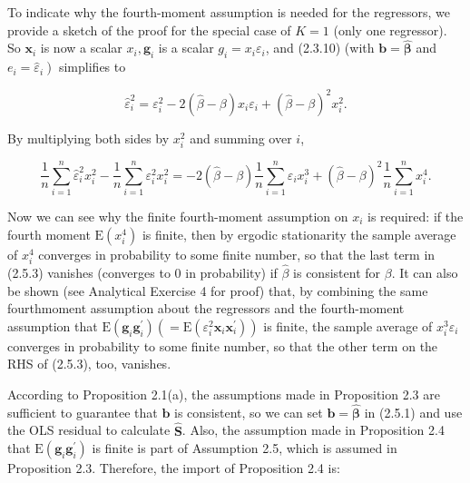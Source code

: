 \documentclass[10pt]{article}
\begin{document}
To indicate why the fourth-moment assumption is needed for the regressors, we provide a sketch of the proof for the special case of $K=1$ (only one regressor). So $\mathbf{x}_{i}$ is now a scalar $x_{i}, \mathbf{g}_{i}$ is a scalar $g_{i}=x_{i} \varepsilon_{i}$, and (2.3.10) (with $\mathbf{b}=\widehat{\boldsymbol{\beta}}$ and $\left.e_{i}=\hat{\varepsilon}_{i}\right)$ simplifies to


\begin{equation*}
\hat{\varepsilon}_{i}^{2}=\varepsilon_{i}^{2}-2(\widehat{\beta}-\beta) x_{i} \varepsilon_{i}+(\widehat{\beta}-\beta)^{2} x_{i}^{2} . \tag{2.5.2}
\end{equation*}


By multiplying both sides by $x_{i}^{2}$ and summing over $i$,


\begin{equation*}
\frac{1}{n} \sum_{i=1}^{n} \hat{\varepsilon}_{i}^{2} x_{i}^{2}-\frac{1}{n} \sum_{i=1}^{n} \varepsilon_{i}^{2} x_{i}^{2}=-2(\widehat{\beta}-\beta) \frac{1}{n} \sum_{i=1}^{n} \varepsilon_{i} x_{i}^{3}+(\widehat{\beta}-\beta)^{2} \frac{1}{n} \sum_{i=1}^{n} x_{i}^{4} . \tag{2.5.3}
\end{equation*}


Now we can see why the finite fourth-moment assumption on $x_{i}$ is required: if the fourth moment $\mathrm{E}\left(x_{i}^{4}\right)$ is finite, then by ergodic stationarity the sample average of $x_{i}^{4}$ converges in probability to some finite number, so that the last term in (2.5.3) vanishes (converges to 0 in probability) if $\widehat{\beta}$ is consistent for $\beta$. It can also be shown (see Analytical Exercise 4 for proof) that, by combining the same fourthmoment assumption about the regressors and the fourth-moment assumption that $\mathrm{E}\left(\mathbf{g}_{i} \mathbf{g}_{i}^{\prime}\right)\left(=\mathrm{E}\left(\varepsilon_{i}^{2} \mathbf{x}_{i} \mathbf{x}_{i}^{\prime}\right)\right)$ is finite, the sample average of $x_{i}^{3} \varepsilon_{i}$ converges in probability to some finite number, so that the other term on the RHS of (2.5.3), too, vanishes.

According to Proposition 2.1(a), the assumptions made in Proposition 2.3 are sufficient to guarantee that $\mathbf{b}$ is consistent, so we can set $\mathbf{b}=\widehat{\boldsymbol{\beta}}$ in (2.5.1) and use the OLS residual to calculate $\widehat{\mathbf{S}}$. Also, the assumption made in Proposition 2.4 that $\mathrm{E}\left(\mathbf{g}_{i} \mathbf{g}_{i}^{\prime}\right)$ is finite is part of Assumption 2.5, which is assumed in Proposition 2.3. Therefore, the import of Proposition 2.4 is:
\end{document}
